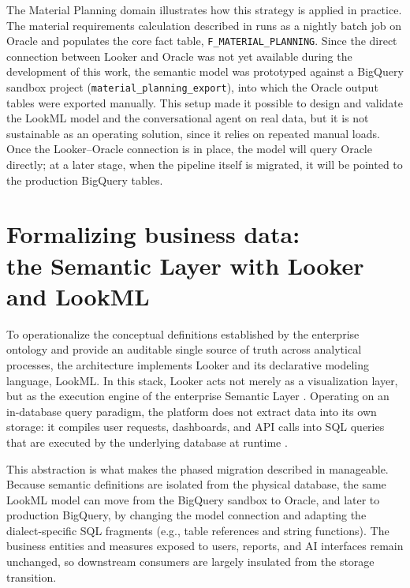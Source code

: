 The Material Planning domain illustrates how this strategy is applied in practice. The material requirements calculation described in 
runs as a nightly batch job on Oracle and populates the core fact table, \texttt{F\_\allowbreak MATERIAL\_\allowbreak PLANNING}.
Since the direct connection between Looker and Oracle was not yet available during the development of this work, the semantic model was prototyped against a
BigQuery sandbox project (\texttt{material\_\allowbreak planning\_\allowbreak export}), into which the Oracle output tables were exported manually.
This setup made it possible to design and validate the LookML model and the conversational agent on real data, but it is not sustainable as an operating solution,
since it relies on repeated manual loads. Once the Looker--Oracle connection is in place, the model will query Oracle directly;
at a later stage, when the pipeline itself is migrated, it will be pointed to the production BigQuery tables.


\section[The Semantic Layer with Looker and LookML]{Formalizing business data:\\ the Semantic Layer with Looker and LookML}
\label{sec:looker_lookml}

To operationalize the conceptual definitions established by the enterprise ontology and provide an auditable single source of truth across analytical processes, 
the architecture implements Looker and its declarative modeling language, LookML. In this stack, Looker acts not merely as a visualization layer, 
but as the execution engine of the enterprise Semantic Layer \cite{patel2023comparative}.
Operating on an in-database query paradigm, the platform does not extract data into its own storage: it compiles user requests, dashboards,
and API calls into SQL queries that are executed by the underlying database at runtime \cite{gartner2021magic}.

This abstraction is what makes the phased migration described in  manageable.
Because semantic definitions are isolated from the physical database, the same LookML model can move from the BigQuery sandbox to Oracle, and later to production BigQuery,
by changing the model connection and adapting the dialect-specific SQL fragments (e.g., table references and string functions).
The business entities and measures exposed to users, reports, and AI interfaces remain unchanged, so downstream consumers are largely insulated from the storage transition.


